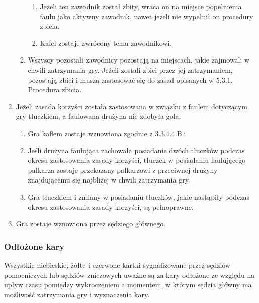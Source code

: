 \documentclass[12pt]{article}
\begin{document}
\begin{enumerate}
\begin{enumerate}
		            \begin{enumerate}
			            \item
			                  Jeżeli ten zawodnik został zbity, wraca on na miejsce popełnienia
			                  faulu jako aktywny zawodnik, nawet jeżeli nie wypełnił on
			                  procedury zbicia.
			            \item
			                  Kafel zostaje zwrócony temu zawodnikowi.
		            \end{enumerate}
		      \item
		            Wszyscy pozostali zawodnicy pozostają na miejscach, jakie zajmowali
		            w chwili zatrzymania gry. Jeżeli zostali zbici przez jej
		            zatrzymaniem, pozostają zbici i muszą zastosować się do zasad
		            opisanych w 5.3.1. Procedura zbicia.
	      \end{enumerate}
	\item
	      Jeżeli zasada korzyści została zastosowana w związku z faulem
	      dotyczącym gry tłuczkiem, a faulowana drużyna nie zdobyła gola:

	      \begin{enumerate}
		      \item
		            Gra kaflem zostaje wznowiona zgodnie z 3.3.4.4.B.i.
		      \item
		            Jeśli drużyna faulująca zachowała posiadanie dwóch tłuczków podczas
		            okresu zastosowania zasady korzyści, tłuczek w posiadaniu
		            faulującego pałkarza zostaje przekazany pałkarzowi z przeciwnej
		            drużyny znajdującemu się najbliżej w chwili zatrzymania gry.
		      \item
		            Gra tłuczkiem i zmiany w posiadaniu tłuczków, jakie nastąpiły
		            podczas okresu zastosowania zasady korzyści, są pełnoprawne.
	      \end{enumerate}
	\item
	      Gra zostaje wznowiona przez sędziego głównego.
\end{enumerate}

\subsubsection{Odłożone kary}

Wszystkie niebieskie, żółte i czerwone kartki sygnalizowane przez
sędziów pomocniczych lub sędziów zniczowych uważne są za kary odłożone
ze względu na upływ czasu pomiędzy wykroczeniem a momentem, w którym
sędzia główny ma możliwość zatrzymania gry i wyznaczenia kary.
\end{document}

